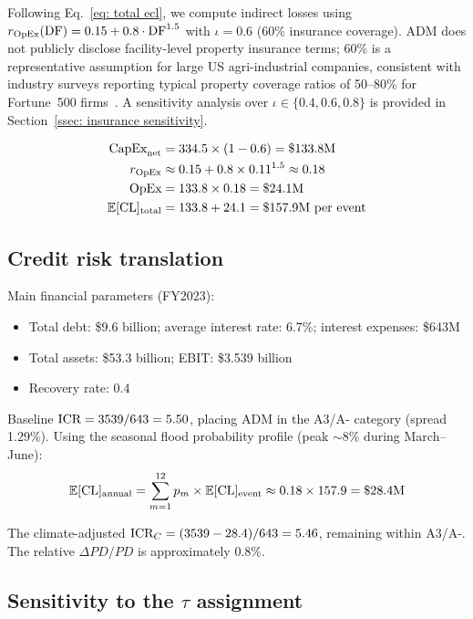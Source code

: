 Following Eq.~\ref{eq: total ecl}, we compute indirect losses using $r_{\text{OpEx}}(\text{DF}) = 0.15 + 0.8 \cdot \text{DF}^{1.5}$ with $\iota = 0.6$ (60\% insurance coverage). ADM does not publicly disclose facility-level property insurance terms; 60\% is a representative assumption for large US agri-industrial companies, consistent with industry surveys reporting typical property coverage ratios of 50--80\% for Fortune~500 firms~\cite{swiss2024global}. A sensitivity analysis over $\iota \in \{0.4, 0.6, 0.8\}$ is provided in Section~\ref{ssec: insurance sensitivity}.

\begin{align*}
\text{CapEx}_{\text{net}} &= 334.5 \times (1 - 0.6) = \$133.8\text{M} \\
r_{\text{OpEx}} &\approx 0.15 + 0.8 \times 0.11^{1.5} \approx 0.18 \\
\text{OpEx} &= 133.8 \times 0.18 = \$24.1\text{M} \\
\mathbb{E}[\text{CL}]_{\text{total}} &= 133.8 + 24.1 = \$157.9\text{M per event}
\end{align*}

\subsection{Credit risk translation}

Main financial parameters (FY2023):
\begin{itemize}
    \item Total debt: \$9.6 billion; average interest rate: 6.7\%; interest expenses: \$643M
    \item Total assets: \$53.3 billion; EBIT: \$3.539 billion
    \item Recovery rate: 0.4
\end{itemize}

Baseline $\text{ICR} = 3539 / 643 = 5.50$, placing ADM in the A3/A- category (spread 1.29\%). Using the seasonal flood probability profile (peak $\sim$8\% during March--June):
\[
\mathbb{E}[\text{CL}]_{\text{annual}} = \sum_{m=1}^{12} p_m \times \mathbb{E}[\text{CL}]_{\text{event}} \approx 0.18 \times 157.9 = \$28.4\text{M}
\]

The climate-adjusted $\text{ICR}_C = (3539 - 28.4) / 643 = 5.46$, remaining within A3/A-. The relative $\Delta PD / PD$ is approximately 0.8\%.

\subsection{Sensitivity to the $\tau$ assignment}
\label{ssec: tau sensitivity}

